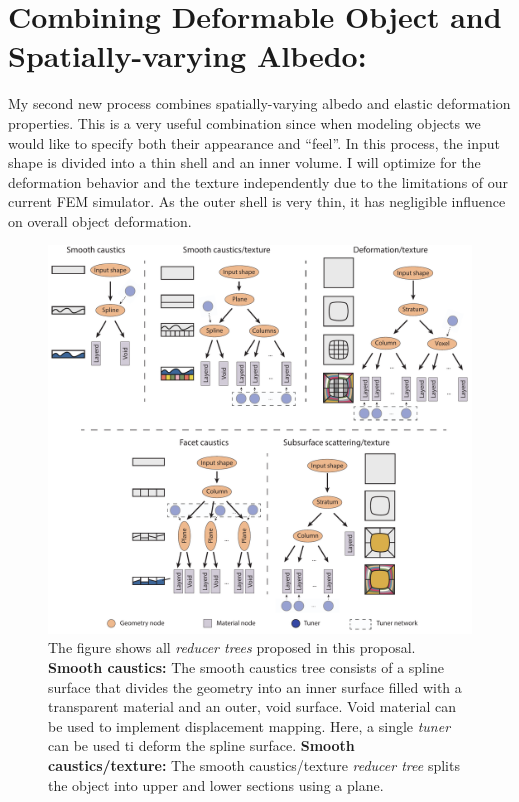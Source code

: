 \section{Combining Deformable Object and Spatially-varying Albedo:}
My second new process combines spatially-varying albedo and elastic deformation properties.
This is a very useful combination since when modeling objects we would like to specify both their appearance and ``feel''.
In this process, the input shape is divided into a thin shell and an inner volume.
I will optimize for the deformation behavior and the texture independently due to the limitations of our current FEM simulator.
As the outer shell is very thin, it has negligible influence on overall object deformation.

\begin{figure}[t]
\centering
\includegraphics*[clip, width = \linewidth]{figure/ReducerNetworksSuplemental}
\caption{The figure shows all \emph{reducer trees} proposed in this proposal.
\textbf{Smooth caustics:} The smooth caustics tree consists of a spline surface that divides the geometry into an inner surface filled with a transparent material and an outer, void surface. Void material can be used to implement displacement mapping.
Here, a single \emph{tuner} can be used ti deform the spline surface.
\textbf{Smooth caustics/texture:} The smooth caustics/texture \emph{reducer tree} splits the object into upper and lower sections using a plane.
}
\end{figure}
